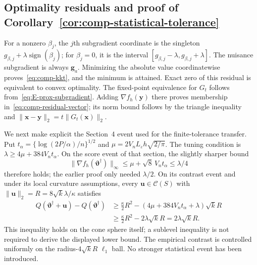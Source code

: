 \subsection{Optimality residuals and proof of Corollary~\ref{cor:comp-statistical-tolerance}}
\label{subapp:comp-tolerance}
For a nonzero $\beta_j$, the $j$th subgradient coordinate is the singleton $g_{\beta,j}+\lambda\operatorname{sign}(\beta_j)$; for $\beta_j=0$, it is the interval $[g_{\beta,j}-\lambda,g_{\beta,j}+\lambda]$. The nuisance subgradient is always $\bm{g}_a$. Minimizing the absolute value coordinatewise proves~\eqref{eq:comp-kkt}, and the minimum is attained. Exact zero of this residual is equivalent to convex optimality. The fixed-point equivalence for $G_t$ follows from~\eqref{eq:E-prox-subgradient}. Adding $\nabla f_h(\bm{y})$ there proves membership in~\eqref{eq:comp-residual-vector}; its norm bound follows by the triangle inequality and $\|\bm{x}-\bm{y}\|_2=t\|G_t(\bm{x})\|_2$.

We next make explicit the Section~4 event used for the finite-tolerance transfer. Put $t_\alpha=\{\log(2P/\alpha)/n\}^{1/2}$ and $\mu=2V_nL_\varepsilon h\sqrt{2/\pi}$. The tuning condition is $\lambda\ge4\mu+384V_nt_\alpha$. On the score event of that section, the slightly sharper bound
\begin{equation}
 \|\nabla f_h(\bm{\vartheta}^\dagger)\|_\infty
 \le\mu+\sqrt8\,V_nt_\alpha\le\lambda/4
 \label{eq:E-reference-score}
\end{equation}
therefore holds; the earlier proof only needed $\lambda/2$. On its contrast event and under its local curvature assumptions, every $\bm{u}\in\mathcal C(S)$ with $\|\bm{u}\|_2=R=8\sqrt{k}\lambda/\kappa$ satisfies
\begin{equation}
 \begin{split}
 Q(\bm{\vartheta}^\dagger+\bm{u})-Q(\bm{\vartheta}^\dagger)
 &\ge\frac\kappa2R^2-
       (4\mu+384V_nt_\alpha+\lambda)\sqrt{k}R\\
 &\ge\frac\kappa2R^2-2\lambda\sqrt{k}R
   =2\lambda\sqrt{k}R.
 \end{split}
 \label{eq:E-sphere-barrier}
\end{equation}
This inequality holds on the cone sphere itself; a sublevel inequality is not required to derive the displayed lower bound. The empirical contrast is controlled uniformly on the radius-$4\sqrt{k}R$ $\ell_1$ ball. No stronger statistical event has been introduced.

